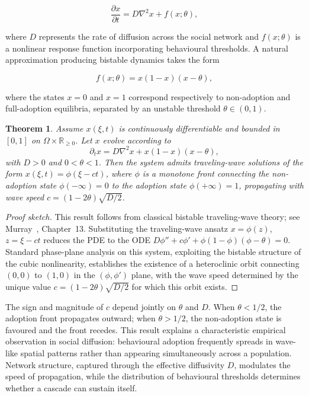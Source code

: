 \documentclass[12pt,a4paper]{article}
\theoremstyle{plain}
\newtheorem{theorem}{Theorem}[section]
\theoremstyle{definition}
\begin{document}
\begin{equation}
\frac{\partial x}{\partial t}
=
D \nabla^2 x + f(x;\theta),
\end{equation}

where $D$ represents the rate of diffusion across the social network and $f(x;\theta)$ is a nonlinear response function incorporating behavioural thresholds. A natural approximation producing bistable dynamics takes the form

\begin{equation}
f(x;\theta) = x(1-x)(x-\theta),
\end{equation}

where the states $x = 0$ and $x = 1$ correspond respectively to non-adoption and full-adoption equilibria, separated by an unstable threshold $\theta \in (0,1)$.

\begin{theorem}
\label{thm:travelingwave}
Assume $x(\xi,t)$ is continuously differentiable and bounded in $[0,1]$ on $\Omega \times \mathbb{R}_{\geq 0}$. Let $x$ evolve according to
\[
\partial_t x = D \nabla^2 x + x(1-x)(x-\theta),
\]
with $D > 0$ and $0 < \theta < 1$. Then the system admits traveling-wave solutions of the form $x(\xi,t) = \phi(\xi - ct)$, where $\phi$ is a monotone front connecting the non-adoption state $\phi(-\infty) = 0$ to the adoption state $\phi(+\infty) = 1$, propagating with wave speed $c = (1-2\theta)\sqrt{D/2}$.
\end{theorem}

\begin{proof}[Proof sketch]
This result follows from classical bistable traveling-wave theory; see Murray~\cite{Murray2002}, Chapter~13. Substituting the traveling-wave ansatz $x = \phi(z)$, $z = \xi - ct$ reduces the PDE to the ODE $D\phi'' + c\phi' + \phi(1-\phi)(\phi-\theta) = 0$. Standard phase-plane analysis on this system, exploiting the bistable structure of the cubic nonlinearity, establishes the existence of a heteroclinic orbit connecting $(0,0)$ to $(1,0)$ in the $(\phi,\phi')$ plane, with the wave speed determined by the unique value $c = (1-2\theta)\sqrt{D/2}$ for which this orbit exists.
\end{proof}

The sign and magnitude of $c$ depend jointly on $\theta$ and $D$. When $\theta < 1/2$, the adoption front propagates outward; when $\theta > 1/2$, the non-adoption state is favoured and the front recedes. This result explains a characteristic empirical observation in social diffusion: behavioural adoption frequently spreads in wave-like spatial patterns rather than appearing simultaneously across a population. Network structure, captured through the effective diffusivity $D$, modulates the speed of propagation, while the distribution of behavioural thresholds determines whether a cascade can sustain itself.
\end{document}
